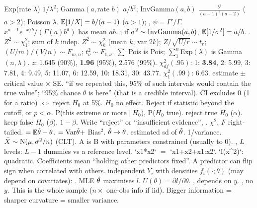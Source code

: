 \sk{} Exp(rate $\lambda$) $1/\lambda^2$; Gamma$(a,\text{rate }b)$ $a/b^2$; InvGamma$(a,b)$ $\frac{b^2}{(a-1)^2(a-2)}$ ($a>2$); Poisson $\lambda$.
\sk{} $\mathbb{E}[1/X]=b/(a-1)$ ($a>1$); , $\psi=\Gamma'/\Gamma$.  $x^{a-1}e^{-x/b}/(\Gamma(a)b^a)$ has mean $ab$. ; if $\sigma^2\sim\mathrm{InvGamma}(a,b)$, $\mathbb{E}[1/\sigma^2]=a/b$.
\sk{} .
\sk{} $Z^2\sim\chi^2_1$; sum of $k$ indep. $Z^2\sim\chi^2_k$ (mean $k$, var $2k$); $Z/\sqrt{U/r}\sim t_r$; $(U/m)/(V/n)\sim F_{m,n}$; $t_\nu^2\sim F_{1,\nu}$. $\sum$ Pois is Pois; $\sum_1^n$Exp$(\lambda)$ is Gamma$(n,\lambda)$.
\sk{} $z$: 1.645 (90\%), \textbf{1.96} (95\%), 2.576 (99\%). $\chi^2_{df}(.95)$: 1: \textbf{3.84}, 2: 5.99, 3: 7.81, 4: 9.49, 5: 11.07, 6: 12.59, 10: 18.31, 30: 43.77. $\chi^2_1(.99)$: 6.63.
\bx
{} estimate $\pm$ critical value $\times$ SE.  “if we repeated this, 95\% of such intervals would contain the true value”;  “95\% chance $\theta$ is here” (that is a credible interval). CI excludes 0 (1 for a ratio) $\iff$ reject $H_0$ at 5\%.
\bx
{} $H_0$ no effect. Reject if statistic beyond the cutoff, or $p<\alpha$.  P(this extreme or more $|\ H_0$),  P($H_0$ true).  reject true $H_0$ ($\alpha$).  keep false $H_0$ ($\beta$).  $1-\beta$. Write “reject” or “insufficient evidence”, . $\chi^2$, $F$ right-tailed.
\bx
{}  $=\mathbb{E}\hat{\theta}-\theta$.  $=\mathrm{Var}\hat{\theta}+$ Bias$^2$.  $\hat{\theta}\to\theta$.  estimated sd of $\hat{\theta}$.  1/variance. $\bar X\sim\mathrm{N}(\mu,\sigma^2/n)$ (CLT).
\bx
{}  A is B with parameters constrained (usually to 0). , $L$ levels: $L-1$ dummies vs a reference level. `x1*x2` $=$ `x1+x2+x1:x2`. `I(x^2)`: quadratic. Coefficients mean “holding other predictors fixed”. A predictor can flip sign when correlated with others.
 independent $Y_i$ with densities $f_i(\cdot;\theta)$ (may depend on covariates): . MLE $\hat{\theta}$ maximises $l$.
\sk{} $U(\theta)=\partial l/\partial\theta$.  , depends on $y$.  , no $y$. This is the whole sample ($n\times$ one-obs info if iid). Bigger information = sharper curvature = smaller variance.
